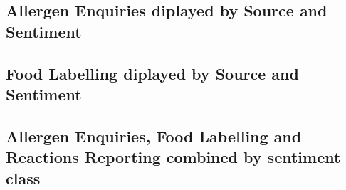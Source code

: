 \subsection{Allergen Enquiries diplayed by Source and Sentiment}

\subsection{Food Labelling diplayed by Source and Sentiment}

\subsection{Allergen Enquiries, Food Labelling and Reactions Reporting combined by sentiment class}
